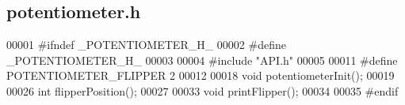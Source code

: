 \subsection{potentiometer.\+h}
\label{potentiometer_8h_source}

\begin{DoxyCode}
00001 \textcolor{preprocessor}{#ifndef \_POTENTIOMETER\_H\_}
00002 \textcolor{preprocessor}{#define \_POTENTIOMETER\_H\_}
00003 
00004 \textcolor{preprocessor}{#include "API.h"}
00005 
00011 \textcolor{preprocessor}{#define POTENTIOMETER\_FLIPPER 2}
00012 
00018 \textcolor{keywordtype}{void} potentiometerInit();
00019 
00026 \textcolor{keywordtype}{int} flipperPosition();
00027 
00033 \textcolor{keywordtype}{void} printFlipper();
00034 
00035 \textcolor{preprocessor}{#endif}
\end{DoxyCode}
